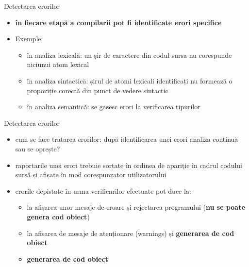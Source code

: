 \documentclass[pdf]{beamer}
\begin{document}
\begin{frame}{Detectarea erorilor}
\begin{itemize}
\item
\textbf{în fiecare etapă a compilarii pot fi identificate erori specifice}

\item
Exemple:

\begin{itemize}
	\item
	în analiza lexicală: un șir de caractere din codul sursa nu corespunde niciunui atom lexical
	\item
	în analiza sintactică: șirul de atomi lexicali identificați nu formează o propoziție corectă din punct de vedere sintactic
	\item
    în analiza semantică: se gasesc erori la verificarea tipurilor
\end{itemize}
\end{itemize}
\end{frame}



\begin{frame}{Detectarea erorilor}
\begin{itemize}
\item
cum se face tratarea erorilor: după identificarea unei erori analiza continuă sau se oprește?

\item
raportarile unei erori trebuie sortate în ordinea de apariție în cadrul codului sursă și afișate în mod corespunzator utilizatorului

\item
erorile depistate în urma verificarilor efectuate pot duce la:
\begin{itemize}
\item
la afișarea unor mesaje de eroare și rejectarea programului (\textbf{nu se poate genera cod obiect})

\item
la afisarea de mesaje de atenționare (warnings) și \textbf{generarea de cod obiect}

\item
\textbf{generarea de cod obiect}
\end{itemize}
\end{itemize}
\end{frame}
\end{document}
